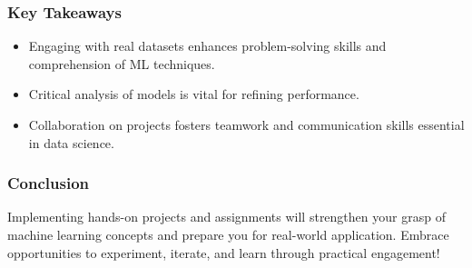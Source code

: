 \documentclass[aspectratio=169]{beamer}
\begin{document}
\begin{frame}
    \frametitle{Key Takeaways}
    \begin{itemize}
        \item Engaging with real datasets enhances problem-solving skills and comprehension of ML techniques.
        \item Critical analysis of models is vital for refining performance.
        \item Collaboration on projects fosters teamwork and communication skills essential in data science.
    \end{itemize}
\end{frame}

\begin{frame}
    \frametitle{Conclusion}
    Implementing hands-on projects and assignments will strengthen your grasp of machine learning concepts and prepare you for real-world application. Embrace opportunities to experiment, iterate, and learn through practical engagement!
\end{frame}
\end{document}
